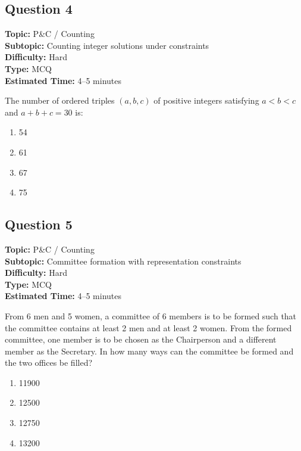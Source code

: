 \documentclass[11pt]{article}
\begin{document}
\subsection*{Question 4}
\textbf{Topic:} P\&C / Counting \\
\textbf{Subtopic:} Counting integer solutions under constraints \\
\textbf{Difficulty:} Hard \\
\textbf{Type:} MCQ \\
\textbf{Estimated Time:} 4--5 minutes

\begin{tcolorbox}
The number of ordered triples \( (a, b, c) \) of positive integers satisfying \( a < b < c \) and \( a + b + c = 30 \) is:
\end{tcolorbox}

\begin{enumerate}[label=(\Alph*)]
\item 54
\item 61
\item 67
\item 75
\end{enumerate}

\subsection*{Question 5}
\textbf{Topic:} P\&C / Counting \\
\textbf{Subtopic:} Committee formation with representation constraints \\
\textbf{Difficulty:} Hard \\
\textbf{Type:} MCQ \\
\textbf{Estimated Time:} 4--5 minutes

\begin{tcolorbox}
From 6 men and 5 women, a committee of 6 members is to be formed such that the committee contains at least 2 men and at least 2 women. From the formed committee, one member is to be chosen as the Chairperson and a different member as the Secretary. In how many ways can the committee be formed and the two offices be filled?
\end{tcolorbox}

\begin{enumerate}[label=(\Alph*)]
\item 11900
\item 12500
\item 12750
\item 13200
\end{enumerate}
\end{document}

